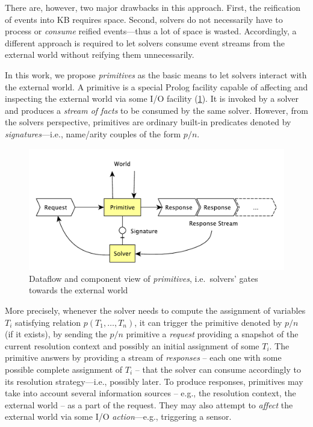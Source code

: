 \documentclass[12pt,a4paper,openright,twoside]{book}
\begin{document}
There are, however, two major drawbacks in this approach.
%
First, the reification of events into KB requires space.
%
Second, solvers do not necessarily have to process or \emph{consume} reified events---thus a lot of space is wasted.
%
Accordingly, a different approach is required to let solvers consume event streams from the external world without reifying them unnecessarily.

In this work, we propose \emph{primitives} as the basic means to let solvers interact with the external world.
%
A primitive is a special Prolog facility capable of affecting and inspecting the external world via some I/O facility (\cref{fig:primitives}).
%
It is invoked by a solver and produces a \emph{stream of facts} to be consumed by the same solver.
%
However, from the solvers perspective, primitives are ordinary built-in predicates denoted by \emph{signatures}---i.e., name/arity couples of the form $p/n$.

\begin{figure}\centering
    \includegraphics[width=.65\linewidth]{figures/primitive.pdf}
    \caption{Dataflow and component view of \emph{primitives}, i.e.\ solvers' gates towards the external world}
    \label{fig:primitives}
\end{figure}

More precisely, whenever the solver needs to compute the assignment of variables $T_i$ satisfying relation $p(T_1, \ldots, T_n)$, it can trigger the primitive denoted by $p/n$ (if it exists), by sending the $p/n$ primitive a \emph{request} providing a snapshot of the current resolution context and possibly an initial assignment of some $T_i$.
%
The primitive answers by providing a stream of \emph{responses} -- each one with some possible complete assignment of $T_i$ -- that the solver can consume accordingly to its resolution strategy---i.e., possibly later.
%
To produce responses, primitives may take into account several information sources -- e.g., the resolution context, the external world -- as a part of the request.
%
They may also attempt to \emph{affect} the external world via some I/O \emph{action}---e.g., triggering a sensor.
\end{document}

